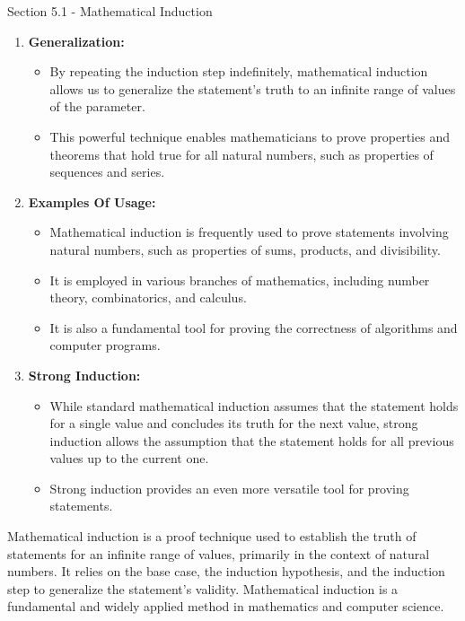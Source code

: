 \begin{notes}{Section 5.1 - Mathematical Induction}
\begin{enumerate}[label = \arabic*.]
\begin{itemize}
            \item In other words, the induction step establishes an implication: if the statement holds for any value \(k\), it also holds for \(k + 1\).
        \end{itemize}
        \item \textbf{Generalization:}
        \begin{itemize}
            \item By repeating the induction step indefinitely, mathematical induction allows us to generalize the statement's truth to an infinite range of values of the parameter.
            \item This powerful technique enables mathematicians to prove properties and theorems that hold true for all natural numbers, such as properties of sequences and series.
        \end{itemize}
        \item \textbf{Examples Of Usage:}
        \begin{itemize}
            \item Mathematical induction is frequently used to prove statements involving natural numbers, such as properties of sums, products, and divisibility.
            \item It is employed in various branches of mathematics, including number theory, combinatorics, and calculus.
            \item It is also a fundamental tool for proving the correctness of algorithms and computer programs.
        \end{itemize}
        \item \textbf{Strong Induction:}
        \begin{itemize}
            \item While standard mathematical induction assumes that the statement holds for a single value and concludes its truth for the next value, strong induction allows the assumption that the 
            statement holds for all previous values up to the current one.
            \item Strong induction provides an even more versatile tool for proving statements.
        \end{itemize}
    \end{enumerate}
        
    Mathematical induction is a proof technique used to establish the truth of statements for an infinite range of values, primarily in the context of natural numbers. It relies on the base case, the 
    induction hypothesis, and the induction step to generalize the statement's validity. Mathematical induction is a fundamental and widely applied method in mathematics and computer science.
\end{notes}

